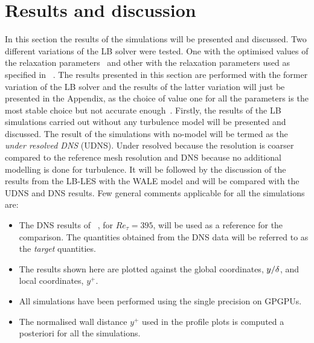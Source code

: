 \newpage

\section{Results and discussion}
In this section the results of the simulations will be presented and discussed. Two different variations of the LB solver were tested. One with the optimised values of the relaxation parameters~\cite{geier:parameter} and other with the relaxation parameters used as specified in ~\cite{geier:cumulant}. The results presented in this section are performed with the former variation of the LB solver  and the results of the latter variation will just be presented in the Appendix, as the choice of value one for all the parameters is the most stable choice but not accurate enough~\cite{geier:parameter}. Firstly, the results of the LB simulations carried out without any turbulence model will be presented and discussed. The result of the simulations with no-model will be termed as the \emph{under resolved DNS} (UDNS). Under resolved because the resolution is coarser compared to the reference mesh resolution and DNS because no additional modelling is done for turbulence. It will be followed by the discussion of the results from the LB-LES with the WALE model and will be compared with the UDNS and DNS results. Few general comments applicable for all the simulations are:

\begin{itemize}
\item The DNS results of~\cite{kim:moin:moser:87} , for $Re_\tau = 395$, will be used as a reference for the comparison. The quantities obtained from the DNS data will be referred to as the \emph{target} quantities.
\item The results shown here are plotted against the global coordinates, $y/\delta$, and local coordinates,  $y^+$.  
\item All simulations have been performed using the single precision on GPGPUs. 
\item The normalised wall distance $y^+$ used in the profile plots is computed a posteriori for all the simulations.
\end{itemize}

